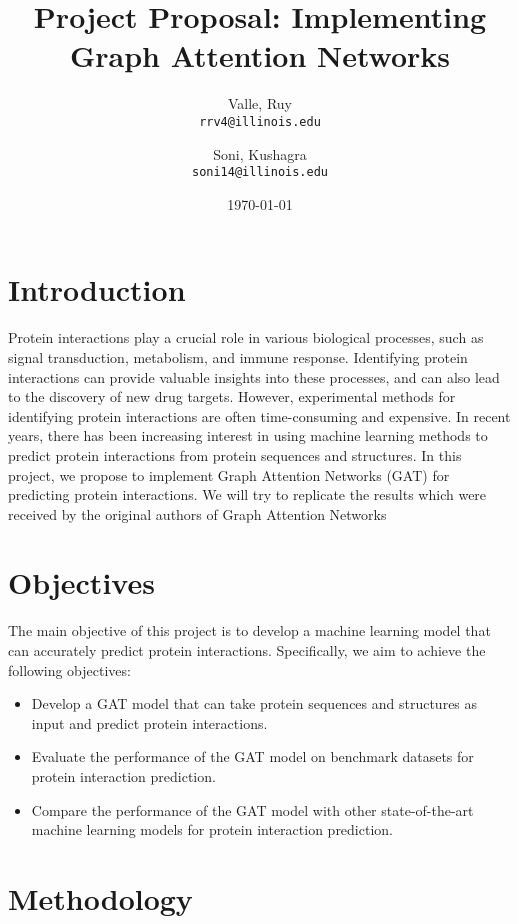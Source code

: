\documentclass{article}
\title{Project Proposal: Implementing Graph Attention Networks}
\author{Valle, Ruy\\
\texttt{rrv4@illinois.edu}
\and
Soni, Kushagra\\
\texttt{soni14@illinois.edu}
}
\date{\today}
\begin{document}
    \maketitle

    \onehalfspacing


    \section{Introduction}\label{sec:introduction}

    Protein interactions play a crucial role in various biological processes, such as signal transduction,
    metabolism, and immune response.
    Identifying protein interactions can provide valuable insights into these processes, and can also lead to the discovery of new drug targets.
    However, experimental methods for identifying protein interactions are often time-consuming and expensive.
    In recent years, there has been increasing interest in using machine learning methods to predict protein interactions from protein sequences and structures.
    In this project, we propose to implement Graph Attention Networks (GAT) for predicting protein interactions.
    We will try to replicate the results which were received by the original authors of Graph Attention Networks~\cite{velickovic2018graph}


    \section{Objectives}\label{sec:objectives}

    The main objective of this project is to develop a machine learning model that can accurately predict protein interactions.
    Specifically, we aim to achieve the following objectives:

    \begin{itemize}
        \item Develop a GAT model that can take protein sequences and structures as input and predict protein interactions.
        \item Evaluate the performance of the GAT model on benchmark datasets for protein interaction prediction.
        \item Compare the performance of the GAT model with other state-of-the-art machine learning models for protein interaction prediction.
    \end{itemize}


    \section{Methodology}\label{sec:methodology}
\end{document}
